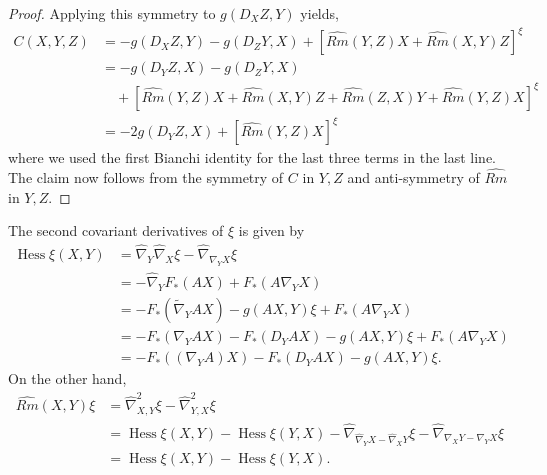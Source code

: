\documentclass{amsart}
\theoremstyle{definition}
\theoremstyle{remark}
\numberwithin{equation}{section}
\begin{document}
\begin{proof}
Applying this symmetry to $g(D_X Z, Y)$ yields,
\begin{equation}
\begin{split}
C(X, Y, Z) &= -g(D_X Z, Y) - g(D_Z Y, X) + \left[\hat{Rm}(Y, Z) X + \hat{Rm}(X, Y)Z\right]^\xi \\
&= -g(D_Y Z, X) - g(D_Z Y, X) \\
&\quad + \left[\hat{Rm}(Y, Z) X + \hat{Rm}(X, Y)Z + \hat{Rm}(Z, X) Y + \hat{Rm}(Y, Z)X\right]^\xi \\
&= - 2g(D_Y Z, X) + \left[\widehat{Rm}(Y, Z)X\right]^{\xi}
\end{split}
\end{equation}
where we used the first Bianchi identity for the last three terms in the last line. The claim now follows from the symmetry of $C$ in $Y,Z$ and anti-symmetry of $\hat{Rm}$ in $Y,Z$.
\end{proof}

The second covariant derivatives of $ \xi$ is given by
\begin{align}
\operatorname{Hess}\xi(X,Y)&=\hat{\nabla}_Y\hat{\nabla}_X\xi-\hat{\nabla}_{\nabla_YX}\xi\\
&=-\hat{\nabla}_YF_{\ast}(AX)+F_{\ast}(A\nabla_YX)\nonumber\\
&=-F_{\ast}(\tilde{\nabla}_{Y}AX)-g(A X,Y)\xi+F_{\ast}(A\nabla_YX)\nonumber\\
&=-F_{\ast}(\nabla_{Y}AX)-F_{\ast}(D_{Y}AX)-g(A X,Y)\xi+F_{\ast}(A\nabla_YX)\nonumber\\
&=-F_{\ast}((\nabla_Y A)X)-F_{\ast}(D_{Y}AX)-g(A X,Y)\xi.\nonumber
\end{align}
On the other hand,
\begin{align}
\widehat{Rm}(X,Y)\xi&=\hat{\nabla}^2_{X,Y}\xi-\hat{\nabla}^2_{Y,X}\xi\\
&=\operatorname{Hess}\xi(X,Y)-\operatorname{Hess}\xi(Y,X)-\hat{\nabla}_{\hat{\nabla}_YX-\hat{\nabla}_XY}\xi-\hat{\nabla}_{\nabla_XY-\nabla_YX}\xi\nonumber\\
&=\operatorname{Hess}\xi(X,Y)-\operatorname{Hess}\xi(Y,X).\nonumber
\end{align}
\end{document}
